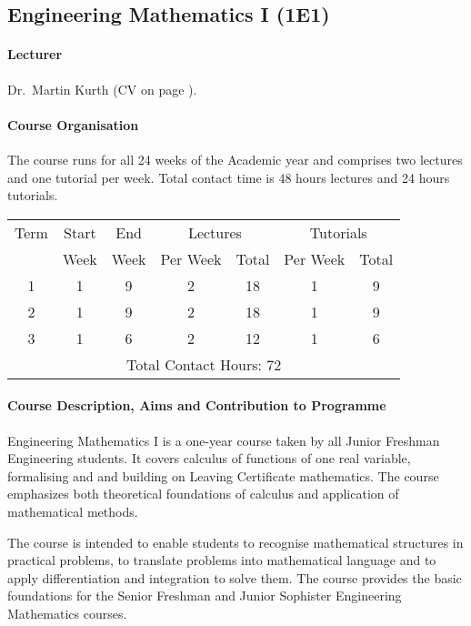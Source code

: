 \subsection{Engineering Mathematics I (1E1)}
\label{Course1E1}
\paragraph{Lecturer} Dr.~Martin Kurth (CV on page \pageref{Martin_Kurth}).

\paragraph{Course Organisation} The course runs for all 24 weeks of the Academic year and comprises
two lectures and one tutorial per week. Total contact time is 48 hours lectures and 24 hours tutorials.

\begin{center}
\begin{tabular}{|c|c|c|c|c|c|c|}
\hline
  Term & Start & End & \multicolumn{2}{|c|}{Lectures} & \multicolumn{2}{|c|}{Tutorials} \\
   &Week&Week& Per Week & Total & Per Week & Total \\
\hline
  1 & 1 & 9 & 2 & 18 & 1 & 9 \\
  2 & 1 & 9 & 2 & 18 & 1 & 9 \\
  3 & 1 & 6 & 2 & 12 & 1 & 6 \\
  \hline
  \multicolumn{7}{|c|}{Total Contact Hours: 72}\\
  \hline
\end{tabular}
\end{center}

\paragraph{Course Description, Aims and Contribution to Programme} Engineering Mathematics I is a one-year
course taken by all Junior Freshman Engineering students. It covers calculus of functions of one
real variable, formalising and and building on Leaving Certificate mathematics. The course emphasizes
both theoretical foundations of calculus and application of mathematical methods.

The course is intended to enable students to recognise mathematical structures in practical problems, to
translate problems into mathematical language and to apply differentiation and integration to solve them.
The course provides the basic foundations for the Senior Freshman and Junior Sophister Engineering
Mathematics courses.

